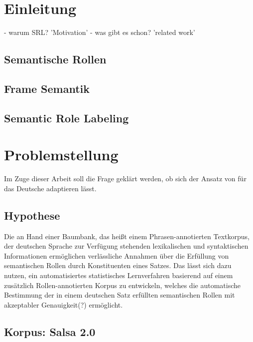 \documentclass[12pt]{article}
\begin{document}
\pagestyle{fancy} %
\fancyhf{} %
\renewcommand{\headrulewidth}{0pt} %
\renewcommand{\footrulewidth}{0pt} %
\fancyfoot[C]{\thepage} %


\newpage
{}

\section{Einleitung}
- warum SRL? 'Motivation'
- was gibt es schon? 'related work'
\subsection{Semantische Rollen}
\subsection{Frame Semantik}
\subsection{Semantic Role Labeling}
\section{Problemstellung}
Im Zuge dieser Arbeit soll die Frage geklärt werden, ob sich der Ansatz von \cite{gildea} für das Deutsche adaptieren lässt.
\subsection{Hypothese}
Die an Hand einer Baumbank, das heißt einem Phrasen-annotierten Textkorpus, der deutschen Sprache zur Verfügung stehenden lexikalischen und syntaktischen Informationen ermöglichen verlässliche Annahmen über die Erfüllung von semantischen Rollen durch Konstituenten eines Satzes. Das lässt sich dazu nutzen, ein automatisiertes statistisches Lernverfahren basierend auf einem zusätzlich Rollen-annotierten Korpus zu entwickeln, welches die automatische Bestimmung der in einem deutschen Satz erfüllten semantischen Rollen mit akzeptabler Genauigkeit(?) ermöglicht.
\subsection{Korpus: Salsa 2.0}
\end{document}
